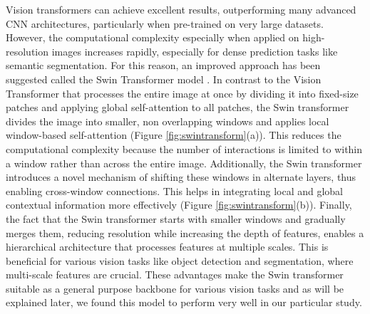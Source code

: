 Vision transformers can achieve excellent results, outperforming many advanced CNN architectures, particularly when pre-trained on very large datasets. However, the computational complexity especially when applied on high-resolution images increases rapidly, especially for dense prediction tasks like semantic segmentation. For this reason, an improved approach has been suggested called the Swin Transformer model \cite{DBLP:journals/corr/abs-2103-14030}. In contrast to the Vision Transformer that processes the entire image at once by dividing it into fixed-size patches and applying global self-attention to all patches, the Swin transformer divides the image into smaller, non overlapping windows and applies local window-based self-attention (Figure \ref{fig:swintransform}(a)). This reduces the computational complexity because the number of interactions is limited to within a window rather than across the entire image. Additionally, the Swin transformer introduces a novel mechanism of shifting these windows in alternate layers, thus enabling cross-window connections. This helps in integrating local and global contextual information more effectively (Figure \ref{fig:swintransform}(b)). Finally, the fact that the Swin transformer starts with smaller windows and gradually merges them, reducing resolution while increasing the depth of features, enables a hierarchical architecture that processes features at multiple scales. This is beneficial for various vision tasks like object detection and segmentation, where multi-scale features are crucial. These advantages make the Swin transformer suitable as a general purpose backbone for various vision tasks and as will be explained later, we found this model to perform very well in our particular study.

